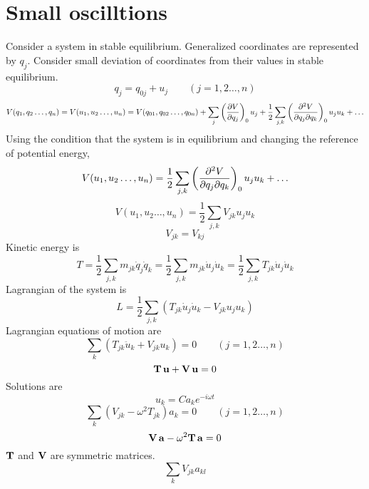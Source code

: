 \documentclass[12pt]{article}
\begin{document}
\section*{Small oscilltions}
Consider a system in stable equilibrium. Generalized coordinates are represented by $q_j$. Consider small deviation of coordinates from their values in stable equilibrium.
\[q_j=q_{0j}+u_j\qquad(j=1,2\ldots,n)\]
\[V(q_1,q_2\ldots,q_n)=V(u_1,u_2\ldots,u_n)=V(q_{01},q_{02}\ldots,q_{0n})+\sum_{j}\left(\pdv{V}{q_j}\right)_0u_j+\frac{1}{2}\sum_{j,k}\left(\pdv[2]{V}{q_j}{q_k}\right)_0u_ju_k+\ldots\]
Using the condition that the system is in equilibrium and changing the reference of potential energy,
\[V(u_1,u_2\ldots,u_n)=\frac{1}{2}\sum_{j,k}\left(\pdv[2]{V}{q_j}{q_k}\right)_0u_ju_k+\ldots\]
\[V(u_1,u_2\ldots,u_n)=\frac{1}{2}\sum_{j,k}V_{jk}u_ju_k\]
\[V_{jk}=V_{kj}\]
Kinetic energy is 
\[T=\frac{1}{2}\sum_{j,k}m_{jk}\dot{q}_j\dot{q}_k=\frac{1}{2}\sum_{j,k}m_{jk}\dot{u}_j\dot{u}_k=\frac{1}{2}\sum_{j,k}T_{jk}\dot{u}_j\dot{u}_k\]
Lagrangian of the system is \[L=\frac{1}{2}\sum_{j,k}(T_{jk}\dot{u}_j\dot{u}_k-V_{jk}u_ju_k)\]
Lagrangian equations of motion are 
\[\sum_k(T_{jk}\ddot{u}_k+V_{jk}u_k)=0\qquad (j=1,2\ldots,n)\]
\[\vb{T}\,\vb{u}+\vb{V}\,\vb{u}=0\]
Solutions are
\[u_k=Ca_ke^{-i\omega t}\]
\[\sum_k(V_{jk}-\omega^2T_{jk})a_k=0\qquad (j=1,2\ldots,n)\]
\[\vb{V}\,\vb{a}-\omega^2\vb{T}\,\vb{a}=0\]
$\vb{T}$ and $\vb{V}$ are symmetric matrices.
\[\sum_{k}V_{jk}a_{kl}\]
\end{document}
